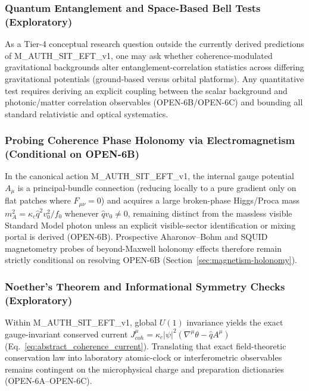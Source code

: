 \documentclass[american,11pt,letterpaper]{article}
\def\mathrm#1{#1}%
\def\texttt#1{#1}%
\begin{document}
\subsubsection{Quantum Entanglement and Space-Based Bell Tests (Exploratory)}

As a Tier-4 conceptual research question outside the currently derived predictions of \texttt{M\_AUTH\_SIT\_EFT\_v1}, one may ask whether coherence-modulated gravitational backgrounds alter entanglement-correlation statistics across differing gravitational potentials (ground-based versus orbital platforms). Any quantitative test requires deriving an explicit coupling between the scalar background and photonic/matter correlation observables (\texttt{OPEN-6B}/\texttt{OPEN-6C}) and bounding all standard relativistic and optical systematics.

\subsubsection{Probing Coherence Phase Holonomy via Electromagnetism (Conditional on \texttt{OPEN-6B})}

In the canonical action \texttt{M\_AUTH\_SIT\_EFT\_v1}, the internal gauge potential $A_\mu$ is a principal-bundle connection (reducing locally to a pure gradient only on flat patches where $F_{\mu\nu} = 0$) and acquires a large broken-phase Higgs/Proca mass $m_A^2 = \kappa_c \hat{q}^2 v_0^2 / f_0$ whenever $\hat{q} v_0 \ne 0$, remaining distinct from the massless visible Standard Model photon unless an explicit visible-sector identification or mixing portal is derived (\texttt{OPEN-6B}). Prospective Aharonov--Bohm and SQUID magnetometry probes of beyond-Maxwell holonomy effects therefore remain strictly conditional on resolving \texttt{OPEN-6B} (Section~\ref{sec:magnetism-holonomy}).

\subsubsection{Noether's Theorem and Informational Symmetry Checks (Exploratory)}

Within \texttt{M\_AUTH\_SIT\_EFT\_v1}, global $U(1)$ invariance yields the exact gauge-invariant conserved current $J^\mu_{\mathrm{coh}} = \kappa_c|\psi|^2(\nabla^\mu\theta - \hat{q}A^\mu)$ (Eq.~\eqref{eq:abstract_coherence_current}). Translating that exact field-theoretic conservation law into laboratory atomic-clock or interferometric observables remains contingent on the microphysical charge and preparation dictionaries (\texttt{OPEN-6A}--\texttt{OPEN-6C}).
\end{document}
